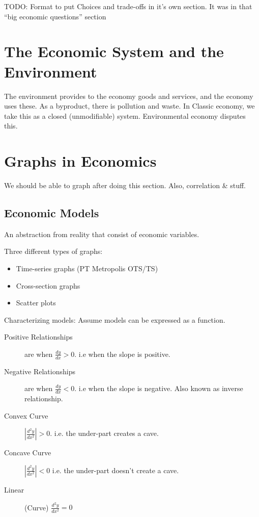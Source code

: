             TODO: Format to put Choices and trade-offs in it's own section. It was in that ``big economic questions'' section
            \section{The Economic System and the Environment} %
            \label{sec:the_economic_system_and_the_environment}
                The environment provides to the economy goods and services, and the economy uses these.
                As a byproduct, there is pollution and waste.
                In Classic economy, we take this as a closed (unmodifiable) system.
                Environmental economy disputes this.

            \section{Graphs in Economics} %
            \label{sec:graphs_in_economics}
                We should be able to graph after doing this section.
                Also, correlation \& stuff.

                \subsection{Economic Models} %
                \label{sub:economic_models}
                    An abstraction from reality that consist of economic variables.

                    Three different types of graphs:
                    \begin{itemize}
                        \item Time-series graphs (PT Metropolis OTS/TS)
                        \item Cross-section graphs
                        \item Scatter plots
                    \end{itemize}

                    Characterizing models:
                    Assume models can be expressed as a function.
                    \begin{description}
                        \item[Positive Relationships] are when $\frac{dy}{dx} > 0$. i.e when the slope is positive.
                        \item[Negative Relationships] are when $\frac{dy}{dx} < 0$. i.e when the slope is negative. Also known as inverse relationship.
                        \item[Convex Curve] $|\frac{d^2y}{dx^2}| > 0$. i.e. the under-part creates a cave.
                        \item[Concave Curve] $|\frac{d^2y}{dx^2}| < 0$ i.e. the under-part doesn't create a cave.
                        \item[Linear] (Curve) $\frac{d^2y}{dx^2} = 0$
                    \end{description}

